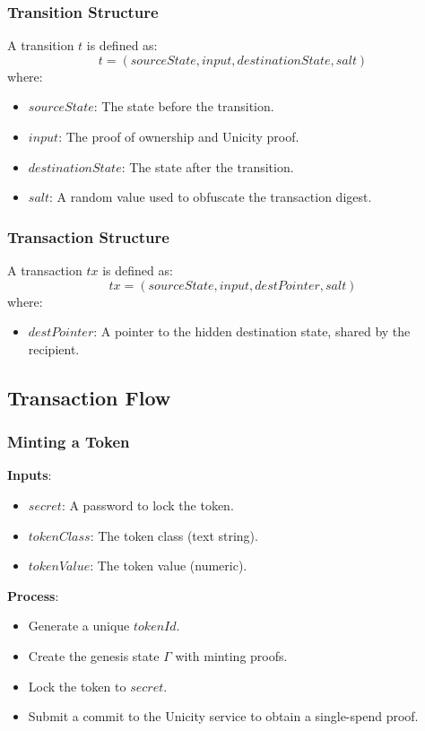 \subsubsection{Transition Structure}

A transition \( t \) is defined as:
\[
t = (sourceState, input, destinationState, salt)
\]
where:
\begin{itemize}
	\item\( sourceState \): The state before the transition.
	\item\( input \): The proof of ownership and Unicity proof.
	\item\( destinationState \): The state after the transition.
	\item\( salt \): A random value used to obfuscate the transaction digest.
\end{itemize}


\subsubsection{Transaction Structure}

A transaction \( tx \) is defined as:
\[
tx = (sourceState, input, destPointer, salt)
\]
where:
\begin{itemize}
	\item \( destPointer \): A pointer to the hidden destination state, shared by the recipient.
\end{itemize}


\subsection{Transaction Flow}

\subsubsection{Minting a Token}

\noindent\textbf{Inputs}:
\begin{itemize}
  \item \( secret \): A password to lock the token.
  \item \( tokenClass \): The token class (text string).
  \item \( tokenValue \): The token value (numeric).
\end{itemize}

\textbf{Process}:
\begin{itemize}
  \item Generate a unique \( tokenId \).
  \item Create the genesis state \( \Gamma \) with minting proofs.
  \item Lock the token to \( secret \).
  \item Submit a commit to the Unicity service to obtain a single-spend proof.
\end{itemize}


